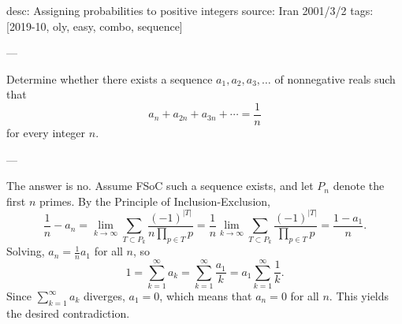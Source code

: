 desc: Assigning probabilities to positive integers
source: Iran 2001/3/2
tags: [2019-10, oly, easy, combo, sequence]

---

Determine whether there exists a sequence $a_1,a_2,a_3,\ldots$ of nonnegative reals such that \[a_n+a_{2n}+a_{3n}+\cdots=\frac1n\]
for every integer $n$.

---

The answer is no. Assume FSoC such a sequence exists, and let $P_n$ denote the first $n$ primes. By the Principle of Inclusion-Exclusion, \[\frac1n-a_n=\lim_{k\to\infty}\sum_{T\subset P_k}\frac{(-1)^{|T|}}{n\prod_{p\in T}p}=\frac1n\lim_{k\to\infty}\sum_{T\subset P_k}\frac{(-1)^{|T|}}{\prod_{p\in T}p}=\frac{1-a_1}n.\]
Solving, $a_n=\tfrac1na_1$ for all $n$, so \[1=\sum_{k=1}^\infty a_k=\sum_{k=1}^\infty\frac{a_1}k=a_1\sum_{k=1}^\infty\frac1k.\]
Since $\sum_{k=1}^\infty a_k$ diverges, $a_1=0$, which means that $a_n=0$ for all $n$. This yields the desired contradiction.
